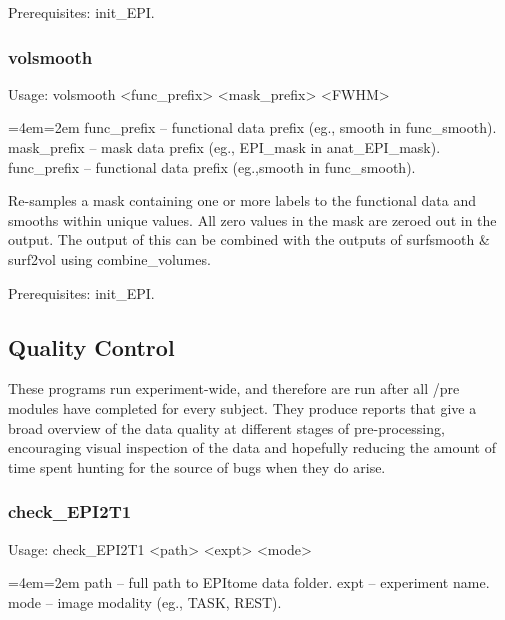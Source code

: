 \documentclass[final,titlepage,letterpaper,oneside,12pt]{article}
\renewcommand{\texttt}[2][BrickRed]{\textcolor{#1}{\ttfamily #2}}%
\newenvironment{blockquote}{%
  \par%
  \medskip
  \leftskip=4em\rightskip=2em%
  \noindent\ignorespaces}{%
  \par\medskip}
\begin{document}
Prerequisites: \texttt{init\_EPI}.

\subsubsection{volsmooth}
Usage: \texttt{volsmooth <func\_prefix> <mask\_prefix> <FWHM>}

\begin{blockquote}
func\_prefix -- functional data prefix (eg., smooth in func\_smooth).
mask\_prefix -- mask data prefix (eg., EPI\_mask in anat\_EPI\_mask).
func\_prefix -- functional data prefix (eg.,smooth in func\_smooth).
\end{blockquote}

\noindent Re-samples a mask containing one or more labels to the functional data and smooths within unique values. All zero values in the mask are zeroed out in the output. The output of this can be combined with the outputs of \texttt{surfsmooth} \& \texttt{surf2vol} using \texttt{combine\_volumes}.

Prerequisites: \texttt{init\_EPI}.

\subsection{Quality Control}

These programs run experiment-wide, and therefore are run after all \texttt{/pre} modules have completed for every subject. They produce reports that give a broad overview of the data quality at different stages of pre-processing, encouraging visual inspection of the data and hopefully reducing the amount of time spent hunting for the source of bugs when they do arise.

\subsubsection{check\_EPI2T1}
Usage: \texttt{check\_EPI2T1 <path> <expt> <mode>}

\begin{blockquote}
path -- full path to EPItome data folder.
expt -- experiment name.
mode -- image modality (eg., TASK, REST).
\end{blockquote}
\end{document}
